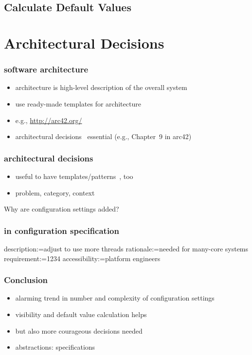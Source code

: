 \subsection{Calculate Default Values}


\section{Architectural Decisions}

\begin{frame}
	\frametitle{software architecture}
	\begin{itemize}
	\item architecture is high-level description of the overall system
	\item use ready-made templates for architecture
	\pause
	\item e.g., \url{http://arc42.org/}
	\item architectural decisions~\cite{zdun2007patterns} essential (e.g., Chapter~9 in arc42)
	\end{itemize}
\end{frame}

\begin{frame}
	\frametitle{architectural decisions}
	\begin{itemize}
	\item useful to have templates/patterns~\cite{zdun2007patterns}, too
	\item problem, category, context
	\end{itemize}
\end{frame}

\begin{frame}
	Why are configuration settings added?
\end{frame}

\begin{frame}[fragile]
	\frametitle{in configuration specification}
\begin{code}
description:=adjust to use more threads
rationale:=needed for many-core systems
requirement:=1234
accessibility:=platform engineers
\end{code}
\end{frame}

\begin{frame}
	\frametitle{Conclusion}
	\begin{itemize}
	\item alarming trend in number and complexity of configuration settings
	\item visibility and default value calculation helps
	\item but also more courageous decisions needed
	\item abstractions: specifications
	\end{itemize}
\end{frame}



\nocite{raab2017introducing}

\appendix

\begin{frame}[allowframebreaks]
	
	
\end{frame}




